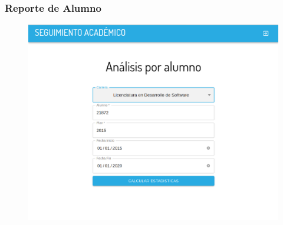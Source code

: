 \subsubsection{Reporte de Alumno}
\begin{figure}[!htbp]
  \centering
    \includegraphics[scale=0.3]{images/seguimiento-academico/sa-form-alumno.png}
  \label{fig:sa-alumno}
\end{figure}